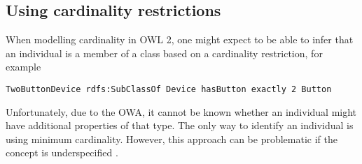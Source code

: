 % 
% 
% 
% 
% 
% 
% 
% 
% 


\subsection{Using cardinality restrictions}
\label{CardinalityRestrictions}

When modelling cardinality in \ac{OWL} 2, one might expect to be able to infer that an individual is a member of a class based on a cardinality restriction, for example

\begin{verbatim}
TwoButtonDevice rdfs:SubClassOf Device hasButton exactly 2 Button
\end{verbatim}

Unfortunately, due to the \ac{OWA}, it cannot be known whether an individual might have additional properties of that type. The only way to identify an individual is using minimum cardinality. However, this approach can be problematic if the concept is underspecified \cite{Hoekstra2008}.



